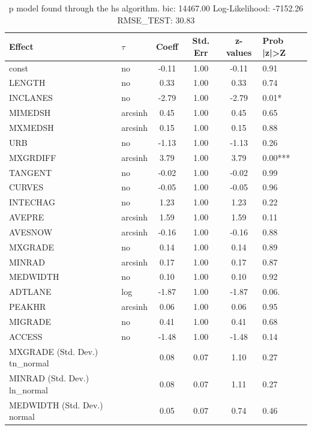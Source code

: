 \begin{table}
	\caption{p model found through the hs algorithm. bic: 14467.00 Log-Likelihood: -7152.26 RMSE_TEST: 30.83}
	\begin{center}
		\begin{tabular}{|l|l|c|c|c|l|}
			\hline
			Effect & $\tau$ & Coeff & Std. Err & z-values & Prob |z|>Z \\
			\hline
			const & no & -0.11 & 1.00 & -0.11 & 0.91 \\
			\hline
			LENGTH & no & 0.33 & 1.00 & 0.33 & 0.74 \\
			\hline
			INCLANES & no & -2.79 & 1.00 & -2.79 & 0.01* \\
			\hline
			MIMEDSH & arcsinh & 0.45 & 1.00 & 0.45 & 0.65 \\
			\hline
			MXMEDSH & arcsinh & 0.15 & 1.00 & 0.15 & 0.88 \\
			\hline
			URB & no & -1.13 & 1.00 & -1.13 & 0.26 \\
			\hline
			MXGRDIFF & arcsinh & 3.79 & 1.00 & 3.79 & 0.00*** \\
			\hline
			TANGENT & no & -0.02 & 1.00 & -0.02 & 0.99 \\
			\hline
			CURVES & no & -0.05 & 1.00 & -0.05 & 0.96 \\
			\hline
			INTECHAG & no & 1.23 & 1.00 & 1.23 & 0.22 \\
			\hline
			AVEPRE & arcsinh & 1.59 & 1.00 & 1.59 & 0.11 \\
			\hline
			AVESNOW & arcsinh & -0.16 & 1.00 & -0.16 & 0.88 \\
			\hline
			MXGRADE & no & 0.14 & 1.00 & 0.14 & 0.89 \\
			\hline
			MINRAD & arcsinh & 0.17 & 1.00 & 0.17 & 0.87 \\
			\hline
			MEDWIDTH & no & 0.10 & 1.00 & 0.10 & 0.92 \\
			\hline
			ADTLANE & log & -1.87 & 1.00 & -1.87 & 0.06. \\
			\hline
			PEAKHR & arcsinh & 0.06 & 1.00 & 0.06 & 0.95 \\
			\hline
			MIGRADE & no & 0.41 & 1.00 & 0.41 & 0.68 \\
			\hline
			ACCESS & no & -1.48 & 1.00 & -1.48 & 0.14 \\
			\hline
			MXGRADE (Std. Dev.) tn_normal &  & 0.08 & 0.07 & 1.10 & 0.27 \\
			\hline
			MINRAD (Std. Dev.) ln_normal &  & 0.08 & 0.07 & 1.11 & 0.27 \\
			\hline
			MEDWIDTH (Std. Dev.) normal &  & 0.05 & 0.07 & 0.74 & 0.46 \\

\end{tabular}
\end{center}
\end{table}
